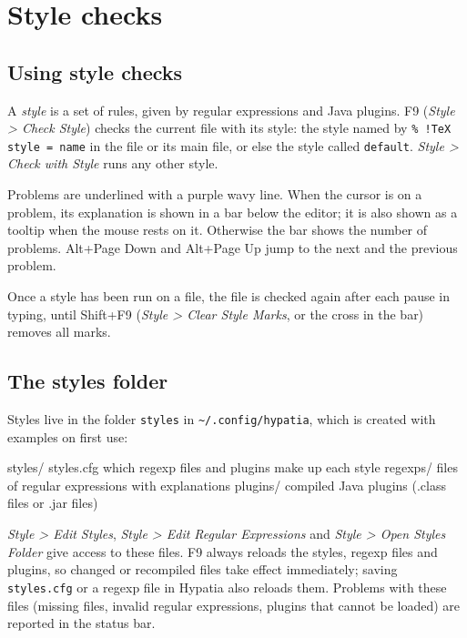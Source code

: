 \documentclass[11pt]{article}
\newcommand{\key}[1]{\textsf{#1}}
\newcommand{\menu}[1]{\textsf{\textit{#1}}}
\newcommand{\file}[1]{\texttt{#1}}
\newcommand{\cfgdir}{\texttt{\textasciitilde/.config/hypatia}}
\begin{document}
    \section{Style checks}\label{sec:style}

    \subsection{Using style checks}

    A \emph{style} is a set of rules, given by regular expressions and Java plugins. \key{F9} (\menu{Style > Check Style}) checks the current file with its style: the style named by \verb+% !TeX style = name+ in the file or its main file, or else the style called \verb+default+. \menu{Style > Check with Style} runs any other style.

    Problems are underlined with a purple wavy line. When the cursor is on a problem, its explanation is shown in a bar below the editor; it is also shown as a tooltip when the mouse rests on it. Otherwise the bar shows the number of problems. \key{Alt+Page Down} and \key{Alt+Page Up} jump to the next and the previous problem.

    Once a style has been run on a file, the file is checked again after each pause in typing, until \key{Shift+F9} (\menu{Style > Clear Style Marks}, or the cross in the bar) removes all marks.

    \subsection{The styles folder}

    Styles live in the folder \file{styles} in \cfgdir, which is created with examples on first use:
    \begin{Code}
styles/
  styles.cfg       which regexp files and plugins make up each style
  regexps/         files of regular expressions with explanations
  plugins/         compiled Java plugins (.class files or .jar files)
    \end{Code}
    \menu{Style > Edit Styles}, \menu{Style > Edit Regular Expressions} and \menu{Style > Open Styles Folder} give access to these files. \key{F9} always reloads the styles, regexp files and plugins, so changed or recompiled files take effect immediately; saving \file{styles.cfg} or a regexp file in Hypatia also reloads them. Problems with these files (missing files, invalid regular expressions, plugins that cannot be loaded) are reported in the status bar.
\end{document}
